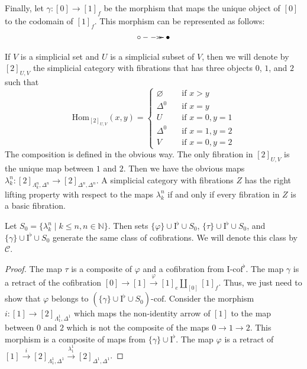 \documentclass[reqno]{amsart}
\theoremstyle{definition}
\theoremstyle{remark}
\newcommand{\fs}[1]{\mathrm{#1}}
\newcommand{\Hom}{\fs{Hom}}
\newcommand{\I}{\fs{I}}
\newcommand{\class}[2]{#1\text{-}\mathrm{#2}}
\newcommand{\Icof}[1][\I]{\class{#1}{cof}}
\numberwithin{figure}{section}
\begin{document}
Finally, let $\gamma : [0] \to [1]_f$ be the morphism that maps the unique object of $[0]$ to the codomain of $[1]_f$.
This morphism can be represented as follows:
\[ \xymatrix{ \circ \ar@{-->>}[r] & \bullet } \]

If $V$ is a simplicial set and $U$ is a simplicial subset of $V$, then we will denote by $[2]_{U,V}$ the simplicial category with fibrations that has three objects $0$, $1$, and $2$ such that
\[ \Hom_{[2]_{U,V}}(x,y) =
  \begin{cases}
    \varnothing & \quad \text{if } x > y \\
    \Delta^0    & \quad \text{if } x = y \\
    U           & \quad \text{if } x = 0, y = 1 \\
    \Delta^0    & \quad \text{if } x = 1, y = 2 \\
    V           & \quad \text{if } x = 0, y = 2
  \end{cases}
\]
The composition is defined in the obvious way.
The only fibration in $[2]_{U,V}$ is the unique map between $1$ and $2$.
Then we have the obvious maps $\lambda^n_k : [2]_{\Lambda^n_k,\Delta^n} \to [2]_{\Delta^n,\Delta^n}$.
A simplicial category with fibrations $Z$ has the right lifting property with respect to the maps $\lambda^n_k$ if and only if every fibration in $Z$ is a basic fibration.

\begin{lem}
Let $S_0 = \{ \lambda^n_k \mid k \leq n, n \in \mathbb{N} \}$.
Then sets $\{ \varphi \} \cup \I^\flat \cup S_0$, $\{ \tau \} \cup \I^\flat \cup S_0$, and $\{ \gamma \} \cup \I^\flat \cup S_0$ generate the same class of cofibrations.
We will denote this class by $\mathcal{C}$.
\end{lem}
\begin{proof}
The map $\tau$ is a composite of $\varphi$ and a cofibration from $\Icof^\flat$.
The map $\gamma$ is a retract of the cofibration $[0] \to [1] \xrightarrow{\varphi} [1]_e \amalg_{[0]} [1]_f$.
Thus, we just need to show that $\varphi$ belongs to $\Icof[(\{ \gamma \} \cup \I^\flat \cup S_0)]$.
Consider the morphism $i : [1] \to [2]_{\Lambda^1_1,\Delta^1}$ which maps the non-identity arrow of $[1]$ to the map between $0$ and $2$ which is not the composite of the maps $0 \to 1 \to 2$.
This morphism is a composite of maps from $\{ \gamma \} \cup \I^\flat$.
The map $\varphi$ is a retract of $[1] \xrightarrow{i} [2]_{\Lambda^1_1,\Delta^1} \xrightarrow{\lambda^1_1} [2]_{\Delta^1,\Delta^1}$.
\end{proof}
\end{document}
